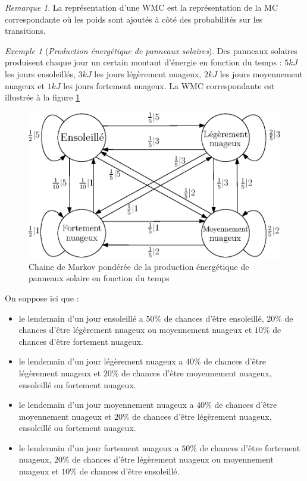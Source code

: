 \documentclass[12pt,a4paper]{report}
\theoremstyle{definition}
\theoremstyle{remark}
\newtheorem{example}{Exemple}[chapter]
\newtheorem{remark}{Remarque}[chapter]
\let\labelitemi\labelitemii
\begin{document}
\begin{remark}
	La représentation d'une WMC est la représentation de la MC correspondante où les poids sont ajoutés à côté des probabilités sur les transitions.
\end{remark}
\begin{example}[\textit{Production énergétique de panneaux solaires}]
	Des panneaux solaires produisent chaque jour un certain montant d'énergie en fonction du temps : $5 kJ$ les jours ensoleillés, $3 kJ$ les jours légèrement nuageux, $2 kJ$ les jours moyennement nuageux et $1 kJ$ les jours fortement nuageux. La WMC correspondante est illustrée à la figure \ref{solar-pannel-1}
	
	\begin{figure}[H]
		\centering
		\includegraphics[scale=0.7]{figures/weather-solar-pannel.eps}
		\caption{Chaine de Markov pondérée de la production énergétique de panneaux solaire en fonction du temps}
		\label{solar-pannel-1}
	\end{figure}
	On suppose ici que :
	\begin{itemize} 
		\renewcommand{\labelitemi}{\tiny$\bullet$}
		\item le lendemain d'un jour ensoleillé a $50 \%$ de chances d'être ensoleillé, $20 \%$ de chances d'être légèrement nuageux ou moyennement nuageux et $10 \%$ de chances d'être fortement nuageux.
		\item le lendemain d'un jour légèrement nuageux a $40 \%$ de chances d'être légèrement nuageux et $20 \%$ de chances d'être moyennement nuageux, ensoleillé ou fortement nuageux.
		\item le lendemain d'un jour moyennement nuageux a $40 \%$ de chances d'être moyennement nuageux et $20 \%$ de chances d'être légèrement nuageux, ensoleillé ou fortement nuageux.
		\item le lendemain d'un jour fortement nuageux a $50 \%$ de chances d'être fortement nuageux, $20 \%$ de chances d'être légèrement nuageux ou moyennement nuageux et $10 \%$ de chances d'être ensoleillé.
	\end{itemize}
\end{example}

{}

\end{document}
